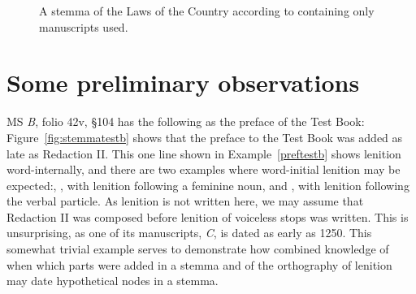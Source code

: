  \begin{figure}[h]
    \centering
{}
    \caption{A stemma of the Laws of the Country  according to \textcite{charles-edwards_textual_2016} containing only manuscripts used.}
    \label{fig:stemmalawc}
  \end{figure}
\section{Some preliminary observations}
\label{sec:some-prel-observ}

MS \textit{B}, folio 42v, \S 104 has the following as the preface of the Test Book:
Figure~\ref{fig:stemmatestb} shows that the preface to the Test Book was added as late as Redaction II.
This one line shown in Example~\ref{preftestb} shows lenition word-internally, and there are two examples  where word-initial lenition may be expected:, , with lenition following a feminine noun, and , with lenition following the verbal particle.
As lenition  is not written here, we may assume that Redaction II was composed before lenition of voiceless stops was written.
This is unsurprising, as one of its manuscripts, \textit{C}, is dated as early as 1250.
This somewhat trivial example serves to demonstrate how combined knowledge of when which parts were added in a stemma and of the orthography of lenition may date hypothetical nodes in a stemma. 


